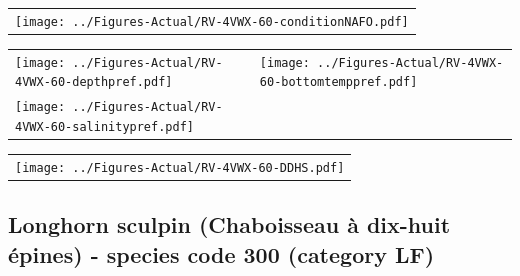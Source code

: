 \documentclass[12pt]{article}\usepackage[]{graphicx}\usepackage[]{color}
\begin{document}
\vspace{1cm}
\begin{minipage}{1.0\textwidth}
 \begin{tabular}{c}
\texttt{[image: ../Figures-Actual/RV-4VWX-60-conditionNAFO.pdf]} \\ 
\end{tabular} 
\end{minipage}
\clearpage
\begin{minipage}{1.0\textwidth}
 \begin{tabular}[t]{m{3in}m{3in}}
\texttt{[image: ../Figures-Actual/RV-4VWX-60-depthpref.pdf]} & 
\texttt{[image: ../Figures-Actual/RV-4VWX-60-bottomtemppref.pdf]} \\ 
\texttt{[image: ../Figures-Actual/RV-4VWX-60-salinitypref.pdf]} & 
 \\ 
\end{tabular} 
\end{minipage}
\newline

\vspace{1cm}
\begin{minipage}{1.0\textwidth}
 \begin{tabular}{c}
\texttt{[image: ../Figures-Actual/RV-4VWX-60-DDHS.pdf]} \\ 
\end{tabular} 
\end{minipage}
\clearpage

\renewcommand\thefigure{\thesubsection\Alph{figure}}

\setcounter{figure}{0}

\hypertarget{sec:300}{%
\subsection{Longhorn sculpin (Chaboisseau à dix-huit épines) - species code 300 (category LF)}\label{sec:300}}

  

\end{document}
